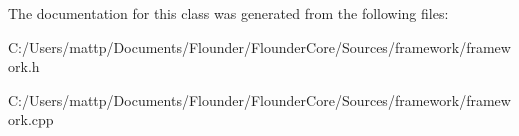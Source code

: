 The documentation for this class was generated from the following files\+:\begin{DoxyCompactItemize}
\item 
C\+:/\+Users/mattp/\+Documents/\+Flounder/\+Flounder\+Core/\+Sources/framework/framework.\+h\item 
C\+:/\+Users/mattp/\+Documents/\+Flounder/\+Flounder\+Core/\+Sources/framework/framework.\+cpp\end{DoxyCompactItemize}
